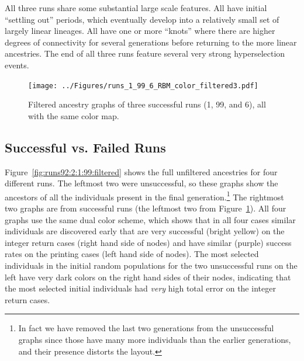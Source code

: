 \documentclass{sig-alternate}
\begin{document}
All three runs share some substantial large scale features. All have initial ``settling out''
periods, which eventually develop into a relatively small set of largely linear lineages.
All have one or more ``knots'' where there are higher degrees of connectivity for several 
generations before returning to the more linear ancestries. The end of all three runs
feature several very strong hyperselection events.

\begin{figure}[tb]
	\begin{center}
		\texttt{[image: ../Figures/runs\_1\_99\_6\_RBM\_color\_filtered3.pdf]}
	\end{center}
	\caption{Filtered ancestry graphs of three successful runs (1, 99, and 6), all with the same color map.}
	\label{fig:runs1:99:6:filtered}
\end{figure}


\subsection{Successful vs. Failed Runs}

Figure~\ref{fig:runs92:2:1:99:filtered} shows the full unfiltered ancestries for four
different runs. The leftmost two were unsuccessful, so these graphs show the ancestors
of all the individuals present in the final generation.\footnote{In fact we have removed
the last two generations from the unsuccessful graphs since those have many more individuals
than the earlier generations, and their presence distorts the layout.} 
The rightmost two graphs are
from successful runs (the leftmost two from Figure~\ref{fig:runs1:99:6:filtered}). All
four graphs use the same dual color scheme, which shows that in all four cases similar
individuals are discovered early that are very successful (bright yellow) on the integer
return cases (right hand side of nodes) and have similar (purple) success rates on the
printing cases (left hand side of nodes). The most selected individuals in the initial
random populations for the two unsuccessful runs on the left have very dark colors on the
right hand sides of their nodes, indicating that the most selected initial individuals
had \emph{very} high total error on the integer return cases.
\end{document}
